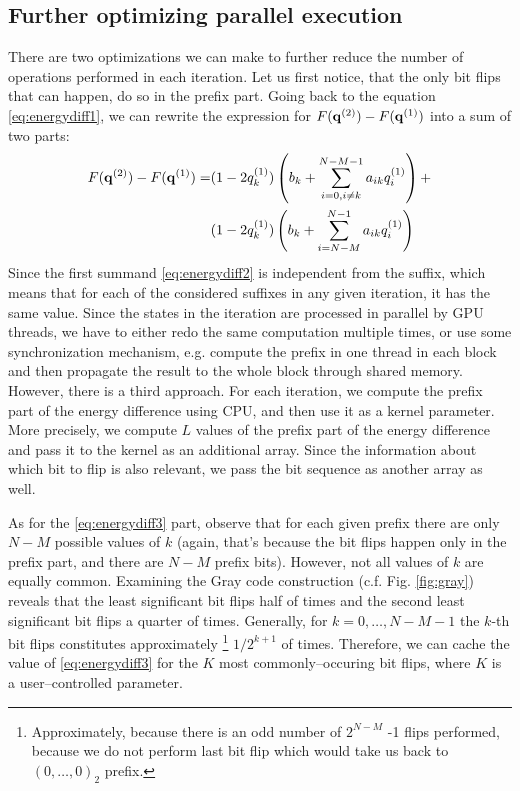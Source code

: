 \subsection{Further optimizing parallel execution}

There are two optimizations we can make to further reduce the number of
operations performed in each iteration. Let us first notice, that the only bit
flips that can happen, do so in the prefix part. Going back to the equation
\eqref{eq:energydiff1}, we can rewrite the expression for $F(\mathbf{q}^{(2)})-F(\mathbf{q}^{(1)})$
into a sum of two parts:
\begin{align}
  F(\mathbf{q}^{(2)})-F(\mathbf{q}^{(1)}) = & (1-2q^{(1)}_{k}) \left(b_{k} + \sum_{i=0,i\ne k}^{N-M-1}a_{ik}q^{(1)}_{i}\right) + \label{eq:energydiff2} \\
                        & (1-2q^{(1)}_{k}) \left(b_{k} + \sum_{i=N-M}^{N-1}a_{ik}q^{(1)}_{i}\right)\label{eq:energydiff3}
\end{align}
Since the first summand \eqref{eq:energydiff2} is independent from the suffix,
which means that for each of the considered suffixes in any given iteration, it
has the same value. Since the states in the iteration are processed in parallel
by GPU threads, we have to either redo the same computation multiple times, or
use some synchronization mechanism, e.g. compute the prefix in one thread in
each block and then propagate the result to the whole block through shared
memory. However, there is a third approach. For each iteration, we compute the
prefix part of the energy difference using CPU, and then use it as a kernel
parameter. More precisely, we compute $L$ values of the prefix part of the
energy difference and pass it to the kernel as an additional array. Since the
information about which bit to flip is also relevant, we pass the bit sequence
as another array as well.

As for the \eqref{eq:energydiff3} part, observe that for each given prefix
there are only $N-M$ possible values of $k$ (again, that's because the bit
flips happen only in the prefix part, and there are $N-M$ prefix bits).
However, not all values of $k$ are equally common. Examining the Gray code
construction (c.f. Fig. \ref{fig:gray}) reveals that the least significant bit
flips half of times and the second least significant bit flips a quarter of
times. Generally, for $k=0,\ldots,N-M-1$ the $k$-th bit flips constitutes
approximately \footnote{Approximately, because there is an odd number of
  $2^{N-M}$ -1 flips performed, because we do not perform last bit flip which
  would take us back to $(0,\ldots,0)_2$ prefix.} $1/2^{k+1}$ of times.
Therefore, we can cache the value of \eqref{eq:energydiff3} for the $K$ most
commonly--occuring bit flips, where $K$ is a user--controlled parameter.
